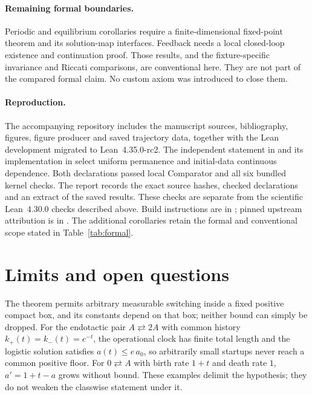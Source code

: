 \documentclass[11pt]{article}
\theoremstyle{definition}
\theoremstyle{remark}
\begin{document}
\paragraph{Remaining formal boundaries.}
Periodic and equilibrium corollaries require a finite-dimensional fixed-point
theorem and its solution-map interfaces. Feedback needs a local closed-loop
existence and continuation proof. Those results, and the fixture-specific
invariance and Riccati comparisons, are conventional here. They are not part
of the compared formal claim. No custom axiom was introduced to close them.

\paragraph{Reproduction.}
The accompanying repository includes the manuscript sources, bibliography,
figures, figure producer and saved trajectory data, together with the Lean
development migrated to Lean~4.35.0-rc2. The independent statement in
 and its implementation in  select
uniform permanence and initial-data continuous dependence. Both declarations
passed local Comparator and all six bundled kernel checks. The report
 records the exact source hashes, checked
declarations and an extract of the saved results. These checks are separate
from the scientific Lean~4.30.0 checks described above. Build instructions are
in ; pinned upstream attribution is in
. The additional corollaries retain the formal
and conventional scope stated in Table~\ref{tab:formal}.

\section{Limits and open questions}\label{sec:limits}

The theorem permits arbitrary measurable switching inside a fixed positive compact
box, and its constants depend on that box; neither bound can simply be dropped.
For the endotactic pair $A\rightleftarrows2A$ with common history
$k_+(t)=k_-(t)=e^{-t}$, the operational clock has finite total length and the
logistic solution satisfies $a(t)\le e\,a_0$, so arbitrarily small startups never
reach a common positive floor. For $0\rightleftarrows A$ with birth rate $1+t$ and
death rate $1$, $a'=1+t-a$ grows without bound. These examples delimit the
hypothesis; they do not weaken the classwise statement under it.
\end{document}
